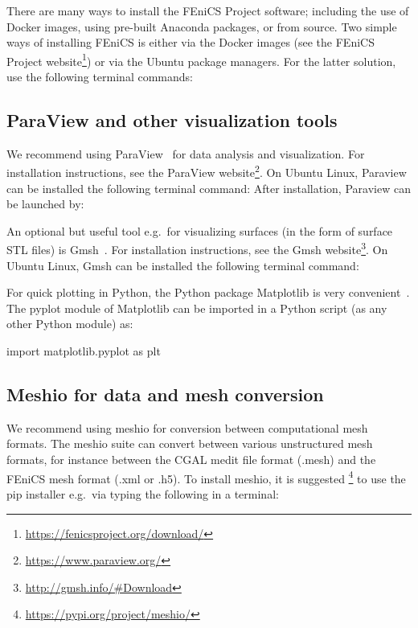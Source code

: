 There are many ways to install the FEniCS Project software; including
the use of Docker images, using pre-built Anaconda packages, or from
source. Two simple ways of installing FEniCS is either via the Docker
images (see the FEniCS Project
website\footnote{\url{https://fenicsproject.org/download/}}) or via the Ubuntu
package managers. For the latter solution, use the following terminal commands:


\subsection{ParaView and other visualization tools}
\label{sec:chp2:paraview}

We recommend using ParaView~\cite{ahrens2005paraview} for data
analysis and visualization. For installation instructions, see the
ParaView website\footnote{\url{https://www.paraview.org/}}. On Ubuntu
Linux, Paraview can be installed the following
terminal command:
\noindent After installation, Paraview can be launched by:

An optional but useful tool e.g.~for visualizing surfaces (in the form
of surface STL files) is Gmsh~\cite{geuzaine2009gmsh}. For installation
instructions, see the Gmsh
website\footnote{\url{http://gmsh.info/\#Download}}. On Ubuntu Linux,
Gmsh can be installed the following terminal command:



For quick plotting in Python, the Python package Matplotlib
is very convenient~\cite{hunter2007matplotlib}. The pyplot module of
Matplotlib can be imported in a Python script (as any other Python
module) as:
\begin{python}
import matplotlib.pyplot as plt
\end{python}

\subsection{Meshio for data and mesh conversion}
\label{sec:chp2:meshio}

We recommend using meshio \cite{schlomer2020nschloe} for conversion
between computational mesh formats. The meshio suite can convert
between various unstructured mesh formats, for instance between the
CGAL medit file format (.mesh) and the FEniCS mesh format (.xml or
.h5). To install meshio, it is
suggested \footnote{\url{https://pypi.org/project/meshio/}} to use the
pip installer e.g.~via typing the following in a terminal:

